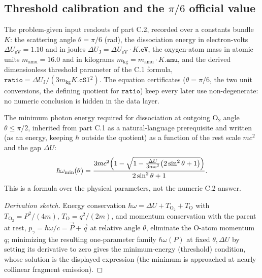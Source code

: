 
\subsection*{Threshold calibration and the $\pi/6$ official value}

\begin{definition}
\label{def:IPhO2026Problems_problem_IPhO_2026_1_C_2:C2CalibratedData}
The problem-given input readouts of part C.2, recorded over a constants
bundle $K$: the scattering angle $\theta = \pi/6$ (rad), the dissociation
energy in electron-volts $\Delta U_{\mathrm{eV}} = 1.10$ and in joules
$\Delta U_{\mathrm{J}} = \Delta U_{\mathrm{eV}}\cdot K.\texttt{eV}$, the
oxygen-atom mass in atomic units $m_{\mathrm{amu}} = 16.0$ and in kilograms
$m_{\mathrm{kg}} = m_{\mathrm{amu}}\cdot K.\texttt{amu}$, and the derived
dimensionless threshold parameter of the C.1 formula,
$\texttt{ratio} = \Delta U_{\mathrm{J}}/(3 m_{\mathrm{kg}}
K.\texttt{cSI}^2)$.  The equation certificates ($\theta = \pi/6$, the two
unit conversions, the defining quotient for $\texttt{ratio}$) keep every
later use non-degenerate: no numeric conclusion is hidden in the data layer.
\end{definition}

\begin{definition}
\label{def:IPhO2026Problems_problem_IPhO_2026_1_C_2:hbarOmegaMin}
The minimum photon energy required for dissociation at outgoing O$_2$ angle
$\theta \le \pi/2$, inherited from part C.1 as a natural-language
prerequisite and written (as an energy, keeping $\hbar$ outside the
quotient) as a function of the rest scale $mc^2$ and the gap $\Delta U$:
\[
\hbar\omega_{\min}(\theta) =
\frac{3 m c^2\Bigl(1 - \sqrt{1 - \tfrac{\Delta U}{3 m c^2}
\bigl(2\sin^2\theta + 1\bigr)}\Bigr)}{2\sin^2\theta + 1} .
\]
This is a formula over the physical parameters, not the numeric C.2 answer.
\end{definition}
\begin{proof}[Derivation sketch]
Energy conservation $\hbar\omega = \Delta U + T_{\mathrm{O_2}} + T_{\mathrm{O}}$
with $T_{\mathrm{O_2}} = P^2/(4m)$, $T_{\mathrm{O}} = q^2/(2m)$, and momentum
conservation with the parent at rest, $p_\gamma = \hbar\omega/c = \vec P + \vec q$
at relative angle $\theta$, eliminate the O-atom momentum $q$; minimizing the
resulting one-parameter family $\hbar\omega(P)$ at fixed $\theta, \Delta U$ by
setting its derivative to zero gives the minimum-energy (threshold) condition,
whose solution is the displayed expression (the minimum is approached at
nearly collinear fragment emission).
\end{proof}

